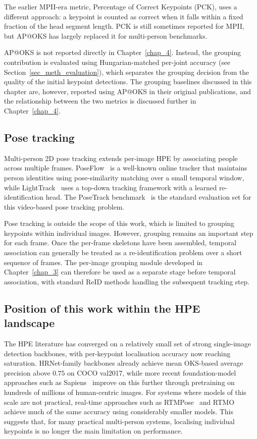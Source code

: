 The earlier MPII-era metric, Percentage of Correct Keypoints (PCK), uses a different approach:
a keypoint is counted as correct when it falls within a fixed fraction of the head segment length.
PCK is still sometimes reported for MPII,
but AP@OKS has largely replaced it for multi-person benchmarks.

AP@OKS is not reported directly in Chapter~\ref{chap_4}.
Instead, the grouping contribution is evaluated using Hungarian-matched per-joint accuracy
(see Section~\ref{sec_meth_evaluation}),
which separates the grouping decision from the quality of the initial keypoint detections.
The grouping baselines discussed in this chapter are, however,
reported using AP@OKS in their original publications,
and the relationship between the two metrics is discussed further in Chapter~\ref{chap_4}.

\subsection{Pose tracking}
\label{sec_lit_hpe_tracking}

Multi-person 2D pose tracking extends per-image HPE by associating people across multiple frames.
PoseFlow~\cite{xiu2018poseflow} is a well-known online tracker
that maintains person identities using pose-similarity matching over a small temporal window,
while LightTrack~\cite{ning2020lighttrack} uses a top-down tracking framework with a learned re-identification head.
The PoseTrack benchmark~\cite{andriluka2018posetrack} is the standard evaluation set
for this video-based pose tracking problem.

Pose tracking is outside the scope of this work,
which is limited to grouping keypoints within individual images.
However, grouping remains an important step for each frame.
Once the per-frame skeletons have been assembled,
temporal association can generally be treated as a re-identification problem over a short sequence of frames.
The per-image grouping module developed in Chapter~\ref{chap_3} can therefore be used as a separate stage
before temporal association,
with standard ReID methods handling the subsequent tracking step.

\subsection{Position of this work within the HPE landscape}
\label{sec_lit_hpe_position}

The HPE literature has converged on a relatively small set of strong single-image detection backbones,
with per-keypoint localisation accuracy now reaching saturation.
HRNet-family backbones already achieve mean OKS-based average precision above $0.75$ on COCO val2017,
while more recent foundation-model approaches such as Sapiens~\cite{khirodkar2024sapiens}
improve on this further through pretraining on hundreds of millions of human-centric images.
For systems where models of this scale are not practical,
real-time approaches such as RTMPose~\cite{jiang2023rtmpose} and RTMO~\cite{lu2024rtmo}
achieve much of the same accuracy using considerably smaller models.
This suggests that, for many practical multi-person systems,
localising individual keypoints is no longer the main limitation on performance.

